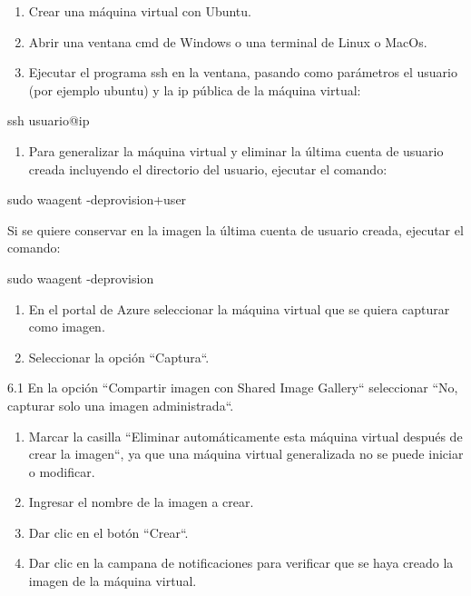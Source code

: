 \begin{enumerate}

\item Crear una máquina virtual con Ubuntu.

\item Abrir una ventana cmd de Windows o una terminal de Linux o MacOs.

\item Ejecutar el programa ssh en la ventana, pasando como parámetros el usuario (por ejemplo ubuntu) y la ip pública de la máquina virtual:

\end{enumerate}

\begin{SourceCode}
ssh usuario@ip
\end{SourceCode}

\begin{enumerate}

\item Para generalizar la máquina virtual y eliminar la última cuenta de usuario creada incluyendo el directorio del usuario, ejecutar el comando:

\end{enumerate}

\begin{SourceCode}
sudo waagent -deprovision+user
\end{SourceCode}

Si se quiere conservar en la imagen la última cuenta de usuario creada, ejecutar el comando:

\begin{SourceCode}
sudo waagent -deprovision
\end{SourceCode}

\begin{enumerate}

\item En el portal de Azure seleccionar la máquina virtual que se quiera capturar como imagen.

\item Seleccionar la opción ``Captura``.

\end{enumerate}

6.1 En la opción ``Compartir imagen con Shared Image Gallery`` seleccionar ``No, capturar solo una imagen administrada``.

\begin{enumerate}

\item Marcar la casilla ``Eliminar automáticamente esta máquina virtual después de crear la imagen``, ya que una máquina virtual generalizada no se puede iniciar o modificar.

\item Ingresar el nombre de la imagen a crear.

\item Dar clic en el botón ``Crear``.

\item Dar clic en la campana de notificaciones para verificar que se haya creado la imagen de la máquina virtual.

\end{enumerate}

